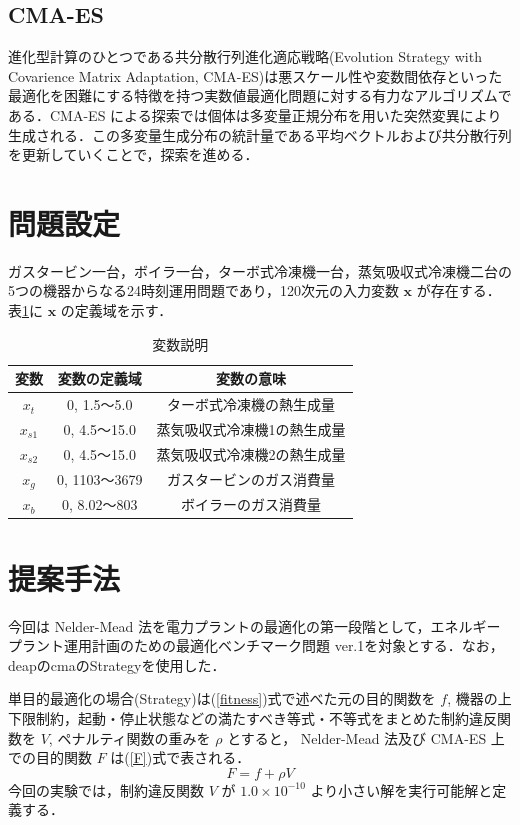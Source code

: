 \documentclass[twocolumn]{jarticle}
\begin{document}
    \subsection{CMA-ES}
    進化型計算のひとつである共分散行列進化適応戦略(Evolution Strategy with Covarience Matrix Adaptation, CMA-ES)\cite{542381}は悪スケール性や変数間依存といった最適化を困難にする特徴を持つ実数値最適化問題に対する有力なアルゴリズムである\cite{akimoto2016}．CMA-ES による探索では個体は多変量正規分布を用いた突然変異により生成される．この多変量生成分布の統計量である平均ベクトルおよび共分散行列を更新していくことで，探索を進める．

\section{問題設定}
ガスタービン一台，ボイラ一台，ターボ式冷凍機一台，蒸気吸収式冷凍機二台の5つの機器からなる24時刻運用問題であり，120次元の入力変数 $\bm{x}$ が存在する．表\ref{explain_variables}に $\bm{x}$ の定義域を示す．
\begin{table}[hbtp]
    \caption{変数説明}
    \label{explain_variables}
    \centering
    \begin{tabular}{|c|c|c|}
        \hline
        変数 & 変数の定義域 & 変数の意味 \\
        \hline
        $x_t$ & 0, 1.5〜5.0 & ターボ式冷凍機の熱生成量 \\
        $x_{s1}$ & 0, 4.5〜15.0 & 蒸気吸収式冷凍機1の熱生成量 \\
        $x_{s2}$ & 0, 4.5〜15.0 & 蒸気吸収式冷凍機2の熱生成量 \\
        $x_g$ & 0, 1103〜3679 & ガスタービンのガス消費量 \\
        $x_b$ & 0, 8.02〜803 & ボイラーのガス消費量 \\
        \hline
    \end{tabular}
  \end{table}
  
\section{提案手法}
今回は Nelder-Mead 法を電力プラントの最適化の第一段階として，エネルギープラント運用計画のための最適化ベンチマーク問題 ver.1\cite{denki}を対象とする．なお，deapのcmaのStrategyを使用した．\cite{DEAP_JMLR2012}

単目的最適化の場合(Strategy)は(\ref{fitness})式で述べた元の目的関数を $f$, 機器の上下限制約，起動・停止状態などの満たすべき等式・不等式をまとめた制約違反関数を $V$, ペナルティ関数の重みを $\rho$ とすると， Nelder-Mead 法及び CMA-ES 上での目的関数 $F$ は(\ref{F})式で表される．
\begin{equation}
    \label{F}
    F = f + \rho V
\end{equation}
今回の実験では，制約違反関数 $V$ が $1.0 \times 10^{-10}$ より小さい解を実行可能解と定義する．
\end{document}
